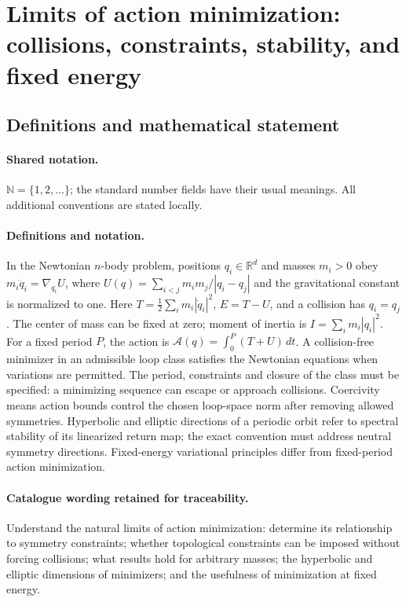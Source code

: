 \documentclass[11pt]{article}
\begin{document}
\section{Limits of action minimization: collisions, constraints, stability, and fixed energy}\label{statement}

\subsection{Definitions and mathematical statement}

\paragraph{Shared notation.}$\mathbb N=\{1,2,\ldots\}$; the standard number fields have their usual meanings. All additional conventions are stated locally.


\paragraph{Definitions and notation.}In the Newtonian $n$-body problem, positions $q_i\in\mathbb R^d$ and masses $m_i>0$ obey $m_i\ddot q_i=\nabla_{q_i}U$, where $U(q)=\sum_{i<j}m_im_j/|q_i-q_j|$ and the gravitational constant is normalized to one. Here $T=\tfrac12\sum_i m_i|\dot q_i|^2$, $E=T-U$, and a collision has $q_i=q_j$. The center of mass can be fixed at zero; moment of inertia is $I=\sum_i m_i|q_i|^2$. For a fixed period $P$, the action is $\mathcal A(q)=\int_0^P(T+U)\,dt$. A collision-free minimizer in an admissible loop class satisfies the Newtonian equations when variations are permitted. The period, constraints and closure of the class must be specified: a minimizing sequence can escape or approach collisions. Coercivity means action bounds control the chosen loop-space norm after removing allowed symmetries. Hyperbolic and elliptic directions of a periodic orbit refer to spectral stability of its linearized return map; the exact convention must address neutral symmetry directions. Fixed-energy variational principles differ from fixed-period action minimization.

\paragraph{Catalogue wording retained for traceability.}
Understand the natural limits of action minimization: determine its relationship to symmetry constraints; whether topological constraints can be imposed without forcing collisions; what results hold for arbitrary masses; the hyperbolic and elliptic dimensions of minimizers; and the usefulness of minimization at fixed energy.
\end{document}
